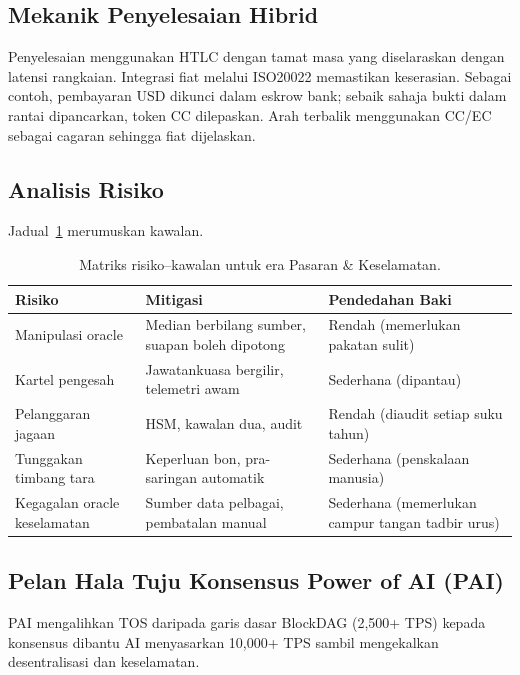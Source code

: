 \documentclass[11pt]{article}
\begin{document}
\subsection{Mekanik Penyelesaian Hibrid}
Penyelesaian menggunakan HTLC dengan tamat masa yang diselaraskan dengan latensi rangkaian. Integrasi fiat melalui ISO20022 memastikan keserasian. Sebagai contoh, pembayaran USD dikunci dalam eskrow bank; sebaik sahaja bukti dalam rantai dipancarkan, token CC dilepaskan. Arah terbalik menggunakan CC/EC sebagai cagaran sehingga fiat dijelaskan.

\subsection{Analisis Risiko}
Jadual~\ref{tab:risk-markets} merumuskan kawalan.

\begin{table}[H]
  \centering
  \begin{tabular}{p{}p{}p{}}
    \toprule
    \textbf{Risiko} & \textbf{Mitigasi} & \textbf{Pendedahan Baki} \\
    \midrule
    Manipulasi oracle & Median berbilang sumber, suapan boleh dipotong & Rendah (memerlukan pakatan sulit) \\
    Kartel pengesah & Jawatankuasa bergilir, telemetri awam & Sederhana (dipantau) \\
    Pelanggaran jagaan & HSM, kawalan dua, audit & Rendah (diaudit setiap suku tahun) \\
    Tunggakan timbang tara & Keperluan bon, pra-saringan automatik & Sederhana (penskalaan manusia) \\
    Kegagalan oracle keselamatan & Sumber data pelbagai, pembatalan manual & Sederhana (memerlukan campur tangan tadbir urus) \\
    \bottomrule
  \end{tabular}
  \caption{Matriks risiko--kawalan untuk era Pasaran \& Keselamatan.}
  \label{tab:risk-markets}
\end{table}

\subsection{Pelan Hala Tuju Konsensus Power of AI (PAI)}
\label{sec:pai-roadmap}
PAI mengalihkan TOS daripada garis dasar BlockDAG (2,500+ TPS) kepada konsensus dibantu AI menyasarkan 10,000+ TPS sambil mengekalkan desentralisasi dan keselamatan.
\end{document}
